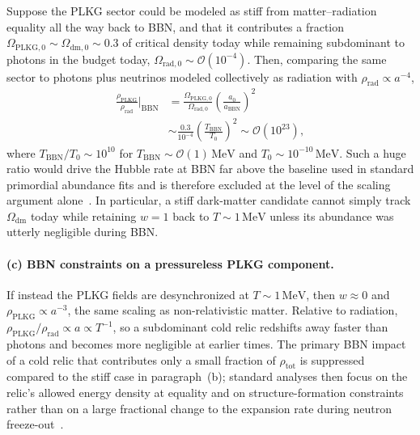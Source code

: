 Suppose the PLKG sector could be modeled as stiff from matter--radiation equality all the way back to BBN, and that it contributes a fraction $\Omega_{\mathrm{PLKG},0}\sim\Omega_{\mathrm{dm},0}\sim 0.3$ of critical density today while remaining subdominant to photons in the budget today, $\Omega_{\mathrm{rad},0}\sim\mathcal{O}(10^{-4})$.
Then, comparing the same sector to photons plus neutrinos modeled collectively as radiation with $\rho_{\mathrm{rad}}\propto a^{-4}$,
\begin{equation}
\begin{aligned}
\frac{\rho_{\mathrm{PLKG}}}{\rho_{\mathrm{rad}}}\Big|_{\mathrm{BBN}}
&=\frac{\Omega_{\mathrm{PLKG},0}}{\Omega_{\mathrm{rad},0}}
\left(\frac{a_0}{a_{\mathrm{BBN}}}\right)^{2} \\
&\sim\frac{0.3}{10^{-4}}\left(\frac{T_{\mathrm{BBN}}}{T_0}\right)^{2}
\sim\mathcal{O}(10^{23}),
\end{aligned}
\label{eq:stiff-bbn-disaster}
\end{equation}
where $T_{\mathrm{BBN}}/T_0\sim 10^{10}$ for $T_{\mathrm{BBN}}\sim\mathcal{O}(1)\,\mathrm{MeV}$ and $T_0\sim 10^{-10}\,\mathrm{MeV}$.
Such a huge ratio would drive the Hubble rate at BBN far above the baseline used in standard primordial abundance fits and is therefore excluded at the level of the scaling argument alone~\cite{Cyburt2016}.
In particular, a stiff dark-matter candidate cannot simply track $\Omega_{\mathrm{dm}}$ today while retaining $w=1$ back to $T\sim 1\,\mathrm{MeV}$ unless its abundance was utterly negligible during BBN.

\paragraph{(c) BBN constraints on a pressureless PLKG component.}
If instead the PLKG fields are desynchronized at $T\sim 1\,\mathrm{MeV}$, then $w\approx 0$ and $\rho_{\mathrm{PLKG}}\propto a^{-3}$, the same scaling as non-relativistic matter.
Relative to radiation, $\rho_{\mathrm{PLKG}}/\rho_{\mathrm{rad}}\propto a\propto T^{-1}$, so a subdominant cold relic redshifts away faster than photons and becomes more negligible at earlier times.
The primary BBN impact of a cold relic that contributes only a small fraction of $\rho_{\mathrm{tot}}$ is suppressed compared to the stiff case in paragraph~(b); standard analyses then focus on the relic's allowed energy density at equality and on structure-formation constraints rather than on a large fractional change to the expansion rate during neutron freeze-out~\cite{Cyburt2016}.

